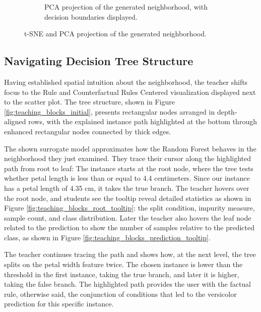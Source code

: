 \begin{figure}[ht]
\begin{subfigure}[c]{0.48\textwidth}
        \caption{PCA projection of the generated neighborhood, with decision boundaries displayed.}
        \label{fig:teaching_scatter_pca}
    \end{subfigure}
    \caption{t-SNE and PCA projection of the generated neighborhood.}
\end{figure}


\subsection{Navigating Decision Tree Structure}

Having established spatial intuition about the neighborhood, the teacher shifts focus to the Rule and Counterfactual Rules Centered visualization displayed next to the scatter plot. The tree structure, shown in Figure \ref{fig:teaching_blocks_initial}, presents rectangular nodes arranged in depth-aligned rows, with the explained instance path highlighted at the bottom through enhanced rectangular nodes connected by thick edges.

The shown surrogate model approximates how the Random Forest behaves in the neighborhood they just examined. They trace their cursor along the highlighted path from root to leaf: The instance starts at the root node, where the tree tests whether petal length is less than or equal to 4.4 centimeters. Since our instance has a petal length of 4.35 cm, it takes the true branch.
The teacher hovers over the root node, and students see the tooltip reveal detailed statistics as shown in Figure \ref{fig:teaching_blocks_root_tooltip}: the split condition, impurity measure, sample count, and class distribution. Later the teacher also hovers the leaf node related to the prediction to show the number of samples relative to the predicted class, as shown in Figure \ref{fig:teaching_blocks_prediction_tooltip}.

The teacher continues tracing the path and shows how, at the next level, the tree splits on the petal width feature twice. The chosen instance is lower than the threshold in the first instance, taking the true branch, and later it is higher, taking the false branch. The highlighted path provides the user with the factual rule, otherwise said, the conjunction of conditions that led to the versicolor prediction for this specific instance.

